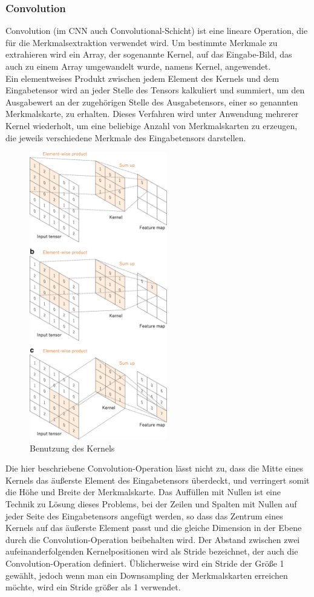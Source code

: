 \documentclass[paper=A4,pagesize=auto,12pt,headinclude=true,footinclude=true,BCOR=0mm,DIV=calc]{scrartcl}
\begin{document}
\subsubsection{Convolution}
Convolution (im CNN auch Convolutional-Schicht) ist eine lineare Operation, die für die Merkmalsextraktion verwendet wird. Um bestimmte Merkmale zu extrahieren wird ein Array, der sogenannte Kernel, auf das Eingabe-Bild, das auch zu einem Array umgewandelt wurde, namens Kernel, angewendet.\\
Ein elementweises Produkt zwischen jedem Element des Kernels und dem Eingabetensor wird an jeder Stelle des Tensors kalkuliert und summiert, um den Ausgabewert an der zugehörigen Stelle des Ausgabetensors, einer so genannten Merkmalskarte, zu erhalten. Dieses Verfahren wird unter Anwendung mehrerer Kernel wiederholt, um eine beliebige Anzahl von Merkmalskarten zu erzeugen, die jeweils verschiedene Merkmale des Eingabetensors darstellen.\\
\begin{figure}
	\centering
	\includegraphics[width=6cm]{"images/cnn.png"}
	\caption{Benutzung des Kernels}
	\label{useofkernel}
\end{figure}
Die hier beschriebene Convolution-Operation lässt nicht zu, dass die Mitte eines Kernels das äußerste Element des Eingabetensors überdeckt, und verringert somit die Höhe und Breite der Merkmalskarte. Das Auffüllen mit Nullen ist eine Technik zu Lösung dieses Problems, bei der Zeilen und Spalten mit Nullen auf jeder Seite des Eingabetensors angefügt werden, so dass das Zentrum eines Kernels auf das äußerste Element passt und die gleiche Dimension in der Ebene durch die Convolution-Operation beibehalten wird. Der Abstand zwischen zwei aufeinanderfolgenden Kernelpositionen wird als Stride bezeichnet, der auch die Convolution-Operation definiert. Üblicherweise wird ein Stride der Größe 1 gewählt, jedoch wenn man ein Downsampling  der Merkmalskarten erreichen möchte, wird ein Stride größer als 1 verwendet.
\end{document}
